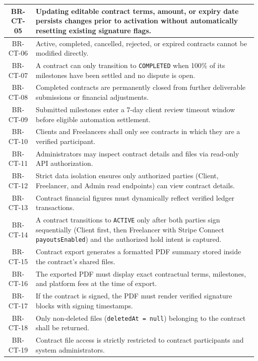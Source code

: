 \begin{longtable}{|c|p{12cm}|}
    BR-CT-05 & Updating editable contract terms, amount, or expiry date persists changes prior to activation without automatically resetting existing signature flags. \\ \hline
    BR-CT-06 & Active, completed, cancelled, rejected, or expired contracts cannot be modified directly. \\ \hline
    BR-CT-07 & A contract can only transition to \texttt{COMPLETED} when 100\% of its milestones have been settled and no dispute is open. \\ \hline
    BR-CT-08 & Completed contracts are permanently closed from further deliverable submissions or financial adjustments. \\ \hline
    BR-CT-09 & Submitted milestones enter a 7-day client review timeout window before eligible automation settlement. \\ \hline
    BR-CT-10 & Clients and Freelancers shall only see contracts in which they are a verified participant. \\ \hline
    BR-CT-11 & Administrators may inspect contract details and files via read-only API authorization. \\ \hline
    BR-CT-12 & Strict data isolation ensures only authorized parties (Client, Freelancer, and Admin read endpoints) can view contract details. \\ \hline
    BR-CT-13 & Contract financial figures must dynamically reflect verified ledger transactions. \\ \hline
    BR-CT-14 & A contract transitions to \texttt{ACTIVE} only after both parties sign sequentially (Client first, then Freelancer with Stripe Connect \texttt{payoutsEnabled}) and the authorized hold intent is captured. \\ \hline
    BR-CT-15 & Contract export generates a formatted PDF summary stored inside the contract's shared files. \\ \hline
    BR-CT-16 & The exported PDF must display exact contractual terms, milestones, and platform fees at the time of export. \\ \hline
    BR-CT-17 & If the contract is signed, the PDF must render verified signature blocks with signing timestamps. \\ \hline
    BR-CT-18 & Only non-deleted files (\texttt{deletedAt = null}) belonging to the contract shall be returned. \\ \hline
    BR-CT-19 & Contract file access is strictly restricted to contract participants and system administrators. \\ \hline

\end{longtable}
